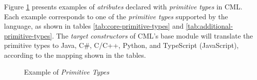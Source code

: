Figure \ref{fig:ex:primitive-types} presents examples
of \emph{atributes} declared with \emph{primitive types} in CML.
Each example corresponds to one of the \emph{primitive types}
supported by the language,
as shown in tables \ref{tab:core-primitive-types} and \ref{tab:additional-primitive-types}.
The \emph{target constructors}
of CML's base module will translate the primitive types to Java, C\#, C/C++,
Python, and TypeScript (JavaScript),
according to the mapping shown in the tables.

\begin{figure}
\verbatimfont{\small}

\caption{Example of \emph{Primitive Types}}
\label{fig:ex:primitive-types}
\end{figure}
